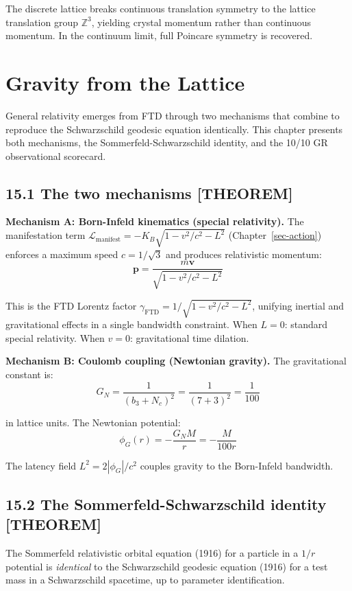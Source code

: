 \documentclass[
  11pt,
  letterpaper,
  twoside,
  openright]{book}
\begin{document}
The discrete lattice breaks continuous translation symmetry to the
lattice translation group \(\mathbb{Z}^3\), yielding crystal momentum
rather than continuous momentum. In the continuum limit, full Poincare
symmetry is recovered.

\chapter{Gravity from the Lattice}\label{sec-gravity}

General relativity emerges from FTD through two mechanisms that combine
to reproduce the Schwarzschild geodesic equation identically. This
chapter presents both mechanisms, the Sommerfeld-Schwarzschild identity,
and the 10/10 GR observational scorecard.

\section{15.1 The two mechanisms
{[}THEOREM{]}}\label{the-two-mechanisms-theorem}

\textbf{Mechanism A: Born-Infeld kinematics (special relativity).} The
manifestation term
\(\mathcal{L}_{\text{manifest}} = -K_B\sqrt{1 - v^2/c^2 - L^2}\)
(Chapter~\ref{sec-action}) enforces a maximum speed \(c = 1/\sqrt{3}\)
and produces relativistic momentum: \[
\mathbf{p} = \frac{m\mathbf{v}}{\sqrt{1 - v^2/c^2 - L^2}}
\tag{15.1}
\]

This is the FTD Lorentz factor
\(\gamma_{\text{FTD}} = 1/\sqrt{1 - v^2/c^2 - L^2}\), unifying inertial
and gravitational effects in a single bandwidth constraint. When
\(L = 0\): standard special relativity. When \(v = 0\): gravitational
time dilation.

\textbf{Mechanism B: Coulomb coupling (Newtonian gravity).} The
gravitational constant is: \[
G_N = \frac{1}{(b_3 + N_c)^2} = \frac{1}{(7 + 3)^2} = \frac{1}{100}
\tag{15.2}
\]

in lattice units. The Newtonian potential: \[
\phi_G(r) = -\frac{G_N M}{r} = -\frac{M}{100r}
\tag{15.3}
\]

The latency field \(L^2 = 2|\phi_G|/c^2\) couples gravity to the
Born-Infeld bandwidth.

\section{15.2 The Sommerfeld-Schwarzschild identity
{[}THEOREM{]}}\label{the-sommerfeld-schwarzschild-identity-theorem}

\begin{ftdtheorem}[Theorem 15.1]

The Sommerfeld relativistic orbital equation (1916) for a particle in a
\(1/r\) potential is \emph{identical} to the Schwarzschild geodesic
equation (1916) for a test mass in a Schwarzschild spacetime, up to
parameter identification.

\end{ftdtheorem}
\end{document}

